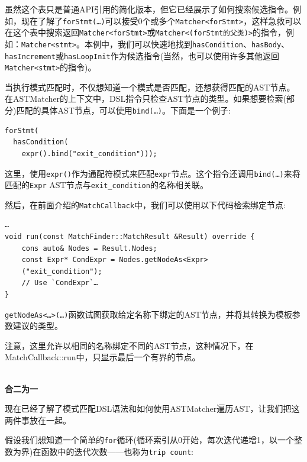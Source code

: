 虽然这个表只是普通API引用的简化版本，但它已经展示了如何搜索候选指令。例如，现在了解了\texttt{forStmt(…)}可以接受0个或多个\texttt{Matcher<forStmt>}，这样急救可以在这个表中搜索返回\texttt{Matcher<forStmt>}或\texttt{Matcher<(forStmt的父类)>}的指令，例如：\texttt{Matcher<stmt>}。本例中，我们可以快速地找到\texttt{hasCondition}、\texttt{hasBody}、\texttt{hasIncrement}或\texttt{hasLoopInit}作为候选指令(当然，也可以使用许多其他返回\texttt{Matcher<stmt>}的指令)。

当执行模式匹配时，不仅想知道一个模式是否匹配，还想获得匹配的AST节点。在ASTMatcher的上下文中，DSL指令只检查AST节点的类型。如果想要检索(部分)匹配的具体AST节点，可以使用\texttt{bind(…)}。下面是一个例子:

\begin{lstlisting}[style=styleCXX]
forStmt(
  hasCondition(
    expr().bind("exit_condition")));
\end{lstlisting}

这里，使用\texttt{expr()}作为通配符模式来匹配\texttt{expr}节点。这个指令还调用\texttt{bind(…)}来将匹配的\texttt{Expr} AST节点与\texttt{exit\_condition}的名称相关联。

然后，在前面介绍的\texttt{MatchCallback}中，我们可以使用以下代码检索绑定节点:

\begin{lstlisting}[style=styleCXX]
…
void run(const MatchFinder::MatchResult &Result) override {
	cons auto& Nodes = Result.Nodes;
	const Expr* CondExpr = Nodes.getNodeAs<Expr>
	("exit_condition");
	// Use `CondExpr`…
}
\end{lstlisting}

\texttt{getNodeAs<…>(…)}函数试图获取给定名称下绑定的AST节点，并将其转换为模板参数建议的类型。

注意，这里允许以相同的名称绑定不同的AST节点，这种情况下，在MatchCallback::run中，只显示最后一个有界的节点。

\hspace*{\fill} \\ %
\noindent
\textbf{合二为一}

现在已经了解了模式匹配DSL语法和如何使用ASTMatcher遍历AST，让我们把这两件事放在一起。

假设我们想知道一个简单的\texttt{for}循环(循环索引从0开始，每次迭代递增1，以一个整数为界)在函数中的迭代次数——也称为\texttt{trip count}:

